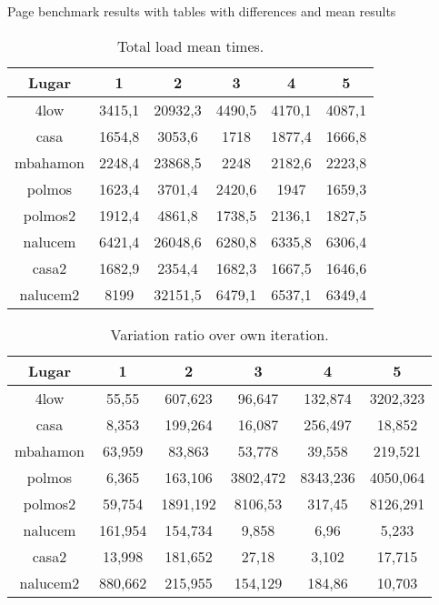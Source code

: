 Page benchmark results with tables with differences and mean results


\begin{table}[ht]
\caption[Page Benchmark Test: Total load mean times]{Total load mean times. }
\begin{center}
\begin{tabular}{|c||c|c|c|c|c|}
\hline
Lugar & 1 & 2 & 3 & 4 & 5 \\ \hline \hline
4low & 3415,1 & 20932,3 & 4490,5 & 4170,1 & 4087,1 \\ \hline
casa & 1654,8 & 3053,6 & 1718 & 1877,4 & 1666,8 \\ \hline
mbahamon & 2248,4 & 23868,5 & 2248 & 2182,6 & 2223,8 \\ \hline
polmos & 1623,4 & 3701,4 & 2420,6 & 1947 & 1659,3 \\ \hline
polmos2 & 1912,4 & 4861,8 & 1738,5 & 2136,1 & 1827,5 \\ \hline
nalucem & 6421,4 & 26048,6 & 6280,8 & 6335,8 & 6306,4 \\ \hline
casa2 & 1682,9 & 2354,4 & 1682,3 & 1667,5 & 1646,6 \\ \hline
nalucem2 & 8199 & 32151,5 & 6479,1 & 6537,1 & 6349,4 \\ \hline
\end{tabular}
\end{center}
\label{table:totalmeantimes}
\end{table}

\begin{table}[ht]
\caption[Page Benchmark Test: Variation ratio over own iteration]{Variation ratio over own iteration.}
\begin{center}
\begin{tabular}{|c||c|c|c|c|c|}
\hline
Lugar & 1 & 2 & 3 & 4 & 5 \\ \hline \hline
4low & 55,55 & 607,623 & 96,647 & 132,874 & 3202,323 \\ \hline
casa & 8,353 & 199,264 & 16,087 & 256,497 & 18,852 \\ \hline
mbahamon & 63,959 & 83,863 & 53,778 & 39,558 & 219,521 \\ \hline
polmos & 6,365 & 163,106 & 3802,472 & 8343,236 & 4050,064 \\ \hline
polmos2 & 59,754 & 1891,192 & 8106,53 & 317,45 & 8126,291 \\ \hline
nalucem & 161,954 & 154,734 & 9,858 & 6,96 & 5,233 \\ \hline
casa2 & 13,998 & 181,652 & 27,18 & 3,102 & 17,715 \\ \hline
nalucem2 & 880,662 & 215,955 & 154,129 & 184,86 & 10,703 \\ \hline
\end{tabular}
\end{center}
\label{table:variationiter}
\end{table}

